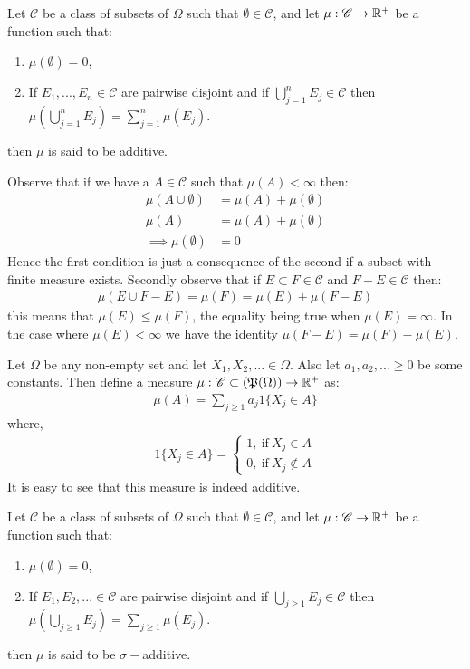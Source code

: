 \begin{definition}
  Let $ \mathscr{C}$ be a class of subsets of $\Omega$ such that $\emptyset \in \mathscr{C}$, and let $\mu: \mathscr{C}\to\mathbb{R}^+$ be a function such that:
  \begin{enumerate}
    \item $\mu(\emptyset) = 0$,
    \item If $E_1,...,E_n \in \mathscr{C}$ are pairwise disjoint and if $\bigcup_{j=1}^nE_j \in \mathscr{C}$ then $\mu(\bigcup_{j=1}^nE_j)=\sum_{j=1}^n\mu(E_j)$.
  \end{enumerate}
  then $\mu$ is said to be additive.
\end{definition}
\begin{remark}
Observe that if we have a $A\in \mathscr{C}$ such that $\mu(A)<\infty$ then:
\begin{align*}
  \mu(A\cup \emptyset) &= \mu(A) + \mu(\emptyset)\\
  \mu(A) &= \mu(A) + \mu(\emptyset)\\
  \implies \mu(\emptyset) &= 0
\end{align*}
Hence the first condition is just a consequence of the second if a subset with finite measure exists. Secondly observe that if $E\subset F \in \mathscr{C}$ and $F-E\in \mathscr{C}$ then:
\begin{align*}
  \mu(E\cup F-E) = \mu(F) = \mu(E) + \mu(F-E)
\end{align*}
this means that $\mu(E)\leq \mu(F)$, the equality being true when $\mu(E) = \infty$. In the case where $\mu(E)<\infty$ we have the identity $\mu(F-E) = \mu(F)-\mu(E)$.
\end{remark}
\begin{example}
  Let $\Omega$ be any non-empty set and let $X_1,X_2,...\in \Omega$. Also let $a_1, a_2,...\geq0$ be some constants. Then define a measure $\mu: \mathscr{C}\subset (\mathfrak{P}(\Omega))\to \mathbb{R}^+$ as:
  \begin{align*}
    \mu(A) = \sum_{j\geq 1} a_j 1\{X_j\in A\}
  \end{align*}
  where,
  \begin{align*}
    1\{X_j\in A\} = \begin{cases}
      1,\ \text{if}\ X_j\in A\\
      0,\ \text{if}\ X_j\notin A
    \end{cases}
  \end{align*}
  It is easy to see that this measure is indeed additive. 
\end{example}
\begin{definition}
  Let $ \mathscr{C}$ be a class of subsets of $\Omega$ such that $\emptyset \in \mathscr{C}$, and let $\mu: \mathscr{C}\to\mathbb{R}^+$ be a function such that:
  \begin{enumerate}
    \item $\mu(\emptyset) = 0$,
    \item If $E_1,E_2,... \in \mathscr{C}$ are pairwise disjoint and if $\bigcup_{j\geq1}E_j \in \mathscr{C}$ then $\mu(\bigcup_{j\geq1}E_j)=\sum_{j\geq1}\mu(E_j)$.
  \end{enumerate}
  then $\mu$ is said to be $\sigma-$additive.
\end{definition}
